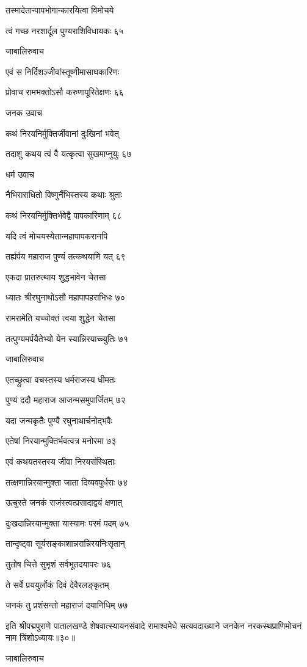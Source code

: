 तस्मादेतान्पापभोगान्कारयित्वा विमोचये

त्वं गच्छ नरशार्दूल पुण्यराशिविधायकः ६५

जाबालिरुवाच

एवं स निर्दिशञ्जीवांस्तूष्णीमासाघकारिणः

प्रोवाच रामभक्तोऽसौ करुणापूरितेक्षणः ६६

जनक उवाच

कथं निरयनिर्मुक्तिर्जीवानां दुःखिनां भवेत्

तदाशु कथय त्वं वै यत्कृत्वा सुखमाप्नुयुः ६७

धर्म उवाच

नैभिराराधितो विष्णुर्नैभिस्तस्य कथाः श्रुताः

कथं निरयनिर्मुक्तिर्भवेद्वै पापकारिणाम् ६८

यदि त्वं मोचयस्येतान्महापापकरानपि

तर्ह्यर्पय महाराज पुण्यं तत्कथयामि यत् ६९

एकदा प्रातरुत्थाय शुद्धभावेन चेतसा

ध्यातः श्रीरघुनाथोऽसौ महापापहराभिधः ७०

रामरामेति यच्चोक्तं त्वया शुद्धेन चेतसा

तत्पुण्यमर्पयैतेभ्यो येन स्यान्निरयाच्च्युतिः ७१

जाबालिरुवाच

एतच्छ्रुत्वा वचस्तस्य धर्मराजस्य धीमतः

पुण्यं ददौ महाराज आजन्मसमुपार्जितम् ७२

यदा जन्मकृतैः पुण्यै रघुनाथार्चनोद्भवैः

एतेषां निरयान्मुक्तिर्भवत्वत्र मनोरमा ७३

एवं कथयतस्तस्य जीवा निरयसंस्थिताः

तत्क्षणान्निरयान्मुक्ता जाता दिव्यवपुर्धराः ७४

ऊचुस्ते जनकं राजंस्त्वत्प्रसादाद्वयं क्षणात्

दुःखदान्निरयान्मुक्ता यास्यामः परमं पदम् ७५

तान्दृष्ट्वा सूर्यसङ्काशान्नरान्निरयनिःसृतान्

तुतोष चित्ते सुभृशं सर्वभूतदयापरः ७६

ते सर्वे प्रययुर्लोकं दिवं देवैरलङ्कृतम्

जनकं तु प्रशंसन्तो महाराजं दयानिधिम् ७७

इति श्रीपद्मपुराणे पातालखण्डे शेषवात्स्यायनसंवादे रामाश्वमेधे सत्यवदाख्याने जनकेन नरकस्थप्राणिमोचनं नाम त्रिंशोऽध्यायः॥३०॥


जाबालिरुवाच

